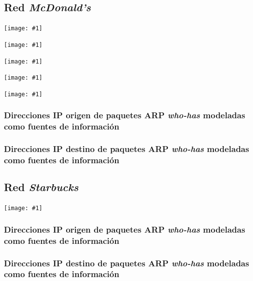 \documentclass[a4paper, 10pt, twoside]{article}
\newcommand{\grafo}[1]{
  \texttt{[image: \#1]}
}
\begin{document}
\subsection{Red \emph{McDonald's}}

\grafo{mcdonalds}

\grafo{mcdonalds-172.17.12.2}

\grafo{mcdonalds-172.17.12.1}

\grafo{mcdonalds-172.17.203.1}

\grafo{mcdonalds-0.0.0.0}


\subsubsection{Direcciones IP origen de paquetes ARP \emph{who-has} modeladas como fuentes de información}




\subsubsection{Direcciones IP destino de paquetes ARP \emph{who-has} modeladas como fuentes de información}




\subsection{Red \emph{Starbucks}}

\grafo{starbucks}


\subsubsection{Direcciones IP origen de paquetes ARP \emph{who-has} modeladas como fuentes de información}




\subsubsection{Direcciones IP destino de paquetes ARP \emph{who-has} modeladas como fuentes de información}







\end{document}

